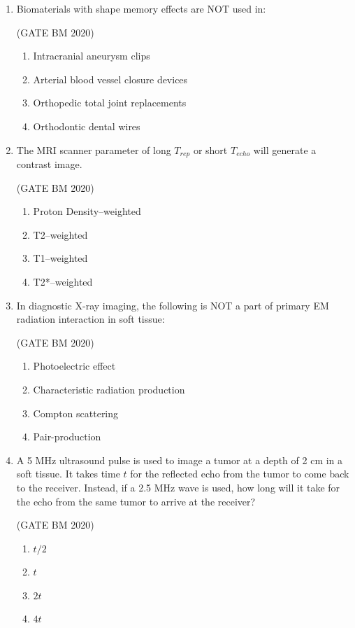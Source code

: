 \documentclass[journal]{IEEEtran}
\begin{document}
\begin{enumerate}
\item Biomaterials with shape memory effects are NOT used in:


	\hfill(GATE BM 2020)
\begin{enumerate}
\item Intracranial aneurysm clips
\item Arterial blood vessel closure devices
\item Orthopedic total joint replacements
\item Orthodontic dental wires
\end{enumerate}



\item The MRI scanner parameter of long $T_{rep}$ or short $T_{echo}$ will generate a \underline{\hspace{2cm}}
contrast image.

\hfill(GATE BM 2020)
\begin{multicols}{2}
\begin{enumerate}
\item Proton Density--weighted
\item T2--weighted
\item T1--weighted
\item T2*--weighted
\end{enumerate}
\end{multicols}


\item In diagnostic X-ray imaging, the following is NOT a part of primary EM radiation 
interaction in soft tissue:


\hfill(GATE BM 2020)
\begin{enumerate}
\item Photoelectric effect
\item Characteristic radiation production
\item Compton scattering
\item Pair-production
\end{enumerate}


\item A 5 MHz ultrasound pulse is used to image a tumor at a depth of 2 cm in a soft tissue. 
It takes time $t$ for the reflected echo from the tumor to come back to the receiver. Instead, 
if a 2.5 MHz wave is used, how long will it take for the echo from the same tumor to arrive 
at the receiver?


\hfill(GATE BM 2020)
\begin{multicols}{4}
\begin{enumerate}
\item $t/2$
\item $t$
\item $2t$
\item $4t$
\end{enumerate}
\end{multicols}



\end{enumerate}
\end{document}
